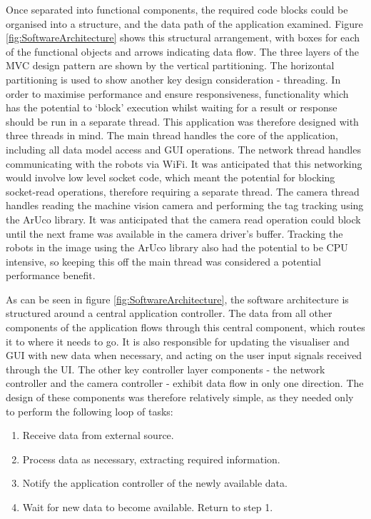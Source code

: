 Once separated into functional components, the required code blocks could be organised into a structure, and the data path of the application examined. Figure \ref{fig:SoftwareArchitecture} shows this structural arrangement, with boxes for each of the functional objects and arrows indicating data flow. The three layers of the MVC design pattern are shown by the vertical partitioning. The horizontal partitioning is used to show another key design consideration - threading. In order to maximise performance and ensure responsiveness, functionality which has the potential to `block' execution whilst waiting for a result or response should be run in a separate thread. This application was therefore designed with three threads in mind. The main thread handles the core of the application, including all data model access and GUI operations. The network thread handles communicating with the robots via WiFi. It was anticipated that this networking would involve low level socket code, which meant the potential for blocking socket-read operations, therefore requiring a separate thread. The camera thread handles reading the machine vision camera and performing the tag tracking using the ArUco library. It was anticipated that the camera read operation could block until the next frame was available in the camera driver's buffer. Tracking the robots in the image using the ArUco library also had the potential to be CPU intensive, so keeping this off the main thread was considered a potential performance benefit.

As can be seen in figure \ref{fig:SoftwareArchitecture}, the software architecture is structured around a central application controller. The data from all other components of the application flows through this central component, which routes it to where it needs to go. It is also responsible for updating the visualiser and GUI with new data when necessary, and acting on the user input signals received through the UI. The other key controller layer components - the network controller and the camera controller - exhibit data flow in only one direction. The design of these components was therefore relatively simple, as they needed only to perform the following loop of tasks:

\begin{enumerate}
 \item Receive data from external source.
 \item Process data as necessary, extracting required information.
 \item Notify the application controller of the newly available data.
 \item Wait for new data to become available. Return to step 1.
\end{enumerate}

